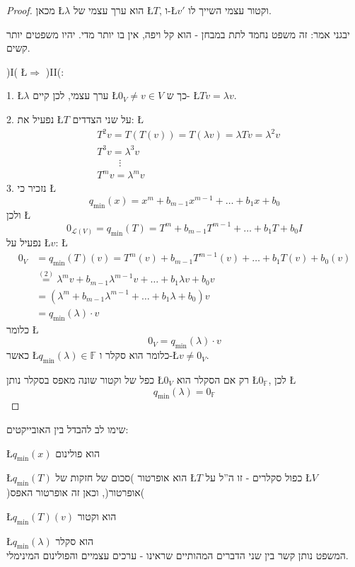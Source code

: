 \documentclass[english,hebrew]{article}
\begin{document}
\begin{proof}
מכאן \L{$\lambda$} הוא ערך עצמי של \L{$T$}, ו-\L{$v'$} וקטור עצמי
השייך לו.

יבגני אמר: זה משפט נחמד לתת במבחן - הוא קל ויפה, אין בו יותר מדי.
יהיו משפטים יותר קשים.

)I( \L{$\Rightarrow$} )II(:

1. \L{$\lambda$} ערך עצמי, לכן קיים \L{$0_{V}\ne v\in V$} כך ש-
\L{$Tv=\lambda v$}.

2. נפעיל את \L{$T$} על שני הצדדים: \L{%
\begin{align*}
 & T^{2}v=T\left(T\left(v\right)\right)=T(\lambda v)=\lambda Tv=\lambda^{2}v\\
 & T^{3}v=\lambda^{3}v\\
 & \quad\quad\ \vdots\\
 & T^{m}v=\lambda^{m}v
\end{align*}
}%
3. נזכיר כי \L{%
\[
q_{\min}(x)=x^{m}+b_{m-1}x^{m-1}+\dots+b_{1}x+b_{0}
\]
}%
ולכן \L{%
\[
0_{\mathcal{L}(V)}=q_{\min}(T)=T^{m}+b_{m-1}T^{m-1}+\dots+b_{1}T+b_{0}I
\]
}%
נפעיל על \L{$v$}: \L{%
\begin{align*}
0_{V} & =q_{\min}(T)\left(v\right)=T^{m}\left(v\right)+b_{m-1}T^{m-1}\left(v\right)+\dots+b_{1}T\left(v\right)+b_{0}\left(v\right)\\
 & \overset{(2)}{=}\lambda^{m}v+b_{m-1}\lambda^{m-1}v+\dots+b_{1}\lambda v+b_{0}v\\
 & =\left(\lambda^{m}+b_{m-1}\lambda^{m-1}+\dots+b_{1}\lambda+b_{0}\right)v\\
 & =q_{\min}(\lambda)\cdot v
\end{align*}
}%
כלומר \L{%
\[
0_{V}=q_{\min}(\lambda)\cdot v
\]
}%
כאשר \L{$q_{\min}(\lambda)\in\mathbb{F}$} כלומר הוא סקלר ו-\L{$v\neq0_{V}$}.

כפל של וקטור שונה מאפס בסקלר נותן \L{$0_{V}$} רק אם הסקלר הוא \L{$0_{\mathbb{F}}$},
לכן \L{%
\[
q_{\min}(\lambda)=0_{\mathbb{F}}
\]
}%
\end{proof}
שימו לב להבדל בין האובייקטים:

\L{$q_{\min}(x)$} הוא פולינום

\L{$q_{\min}(T)$} הוא אופרטור )סכום של חזקות של \L{$T$} כפול סקלרים
- זו ה\textquotedblright ל על \L{$V$} )אופרטור(, וכאן זה אופרטור
האפס(

\L{$q_{\min}(T)\left(v\right)$} הוא וקטור

\L{$q_{\min}(\lambda)$} הוא סקלר\\

המשפט נותן קשר בין שני הדברים המהותיים שראינו - ערכים עצמיים והפולינום
המינימלי.
\end{document}
